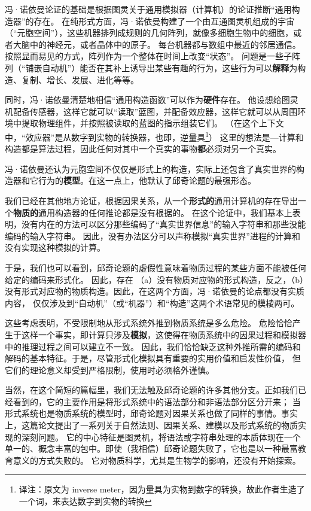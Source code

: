 \documentclass[a4paper,12pt]{article}
\begin{document}
冯·诺依曼论证的基础是根据图灵关于通用模拟器（计算机）的论证推断“通用构造器”的存在。
在纯形式方面，冯·诺依曼构建了一个由互通图灵机组成的宇宙（“元胞空间”），这些机器排列成规则的几何阵列，就像多细胞生物中的细胞，或者大脑中的神经元，或者晶体中的原子。
每台机器都与数组中最近的邻居通信。按照显而易见的方式，阵列作为一个整体在时间上改变“状态”。
问题是一些子阵列（“铺嵌自动机”）能否在其补上诱导出某些有趣的行为，这些行为可以\textbf{解释}为构造、复制、增长、发展、进化等等。

同时，冯·诺依曼清楚地相信“通用构造函数”可以作为\textbf{硬件}存在。
他设想给图灵机配备传感器，这样它就可以“读取”蓝图，并配备效应器，这样它就可以从周围环境中提取物理组件，并按照被读取的蓝图的指示组装它们。
（在这个上下文中，“效应器”是从数字到实物的转换器，也即，逆量具\footnote[1]{译注：原文为 inverse meter，因为量具为实物到数字的转换，故此作者生造了一个词，来表达数字到实物的转换}）
这里的想法是—计算和构造都是算法过程，因此任何对其中一个真实的事物\textbf{都}必须对另一个真实。

冯·诺依曼还认为元胞空间不仅仅是形式上的构造，实际上还包含了真实世界的构造器和它行为的\textbf{模型}。在这一点上，他默认了邱奇论题的最强形态。

我们已经在其他地方\cite{RosenR1985}论证，根据因果关系，从一个\textbf{形式的}通用计算机的存在导出一个\textbf{物质的}通用构造器的任何推论都是没有根据的。
在这个论证中，我们基本上表明，没有内在的方法可以区分那些编码了“真实世界信息”的输入字符串和那些没能编码的输入字符串。
因此，没有办法区分可以声称模拟“真实世界”进程的计算和没有实现这种模拟的计算。

于是，我们也可以看到，邱奇论题的虚假性意味着物质过程的某些方面不能被任何给定的编码来形式化。
因此，存在 （a）没有物质对应物的形式构造，反之，（b）没有形式对应物的物质构造。因此，在这两个方面，冯·诺依曼的论点都没有实质内容，
仅仅涉及到“自动机”（或“机器”）和“构造”这两个术语常见的模棱两可。

这些考虑表明，不受限制地从形式系统外推到物质系统是多么危险。
危险恰恰产生于这样一个事实，即计算只涉及\textbf{模拟}，这使得在物质系统中的因果过程和模拟器中的推理过程之间可以建立不一致。
因此，我们恰恰缺乏这种外推所需的编码和解码的基本特征。于是，尽管形式化模拟具有重要的实用价值和启发性价值，
但它们的理论意义却受到严格限制，使用时必须格外谨慎。

当然，在这个简短的篇幅里，我们无法触及邱奇论题的许多其他分支。正如我们已经看到的，它的主要作用是将形式系统中的语法部分和非语法部分区分开来；
当形式系统也是物质系统的模型时，邱奇论题对因果关系也做了同样的事情。事实上，这篇论文提出了一系列关于自然法则、因果关系、建模以及形式系统的物质实现的深刻问题。
它的中心特征是图灵机，将语法或字符串处理的本质体现在一个单一的、概念丰富的包中。即使（我相信）邱奇论题失败了，它也是以一种最富教育意义的方式失败的。
它对物质科学，尤其是生物学的影响，还没有开始探索。
\end{document}
